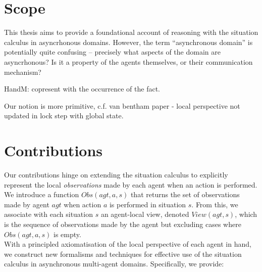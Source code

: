 \newpage{}


\section{Scope}

This thesis aims to provide a foundational account of reasoning with
the situation calculus in asyncrhonous domains. However, the term
{}``asynchronous domain'' is potentially quite confusing -- precisely
what aspects of the domain are asyncrhonous? Is it a property of the
agents themselves, or their communication mechanism?

HandM: copresent with the occurrence of the fact.

Our notion is more primitive, c.f. van bentham paper - local perspective
not updated in lock step with global state.


\section{Contributions}

Our contributions hinge on extending the situation calculus to explicitly
represent the local \emph{observations} made by each agent when an
action is performed. We introduce a function $Obs(agt,a,s)$ that
returns the set of observations made by agent $agt$ when action $a$
is performed in situation $s$. From this, we associate with each
situation $s$ an agent-local view, denoted $View(agt,s)$, which
is the sequence of observations made by the agent but excluding cases
where $Obs(agt,a,s)$ is empty.\\


With a principled axiomatisation of the local perspective of each
agent in hand, we construct new formalisms and techniques for effective
use of the situation calculus in asynchronous multi-agent domains.
Specifically, we provide:


